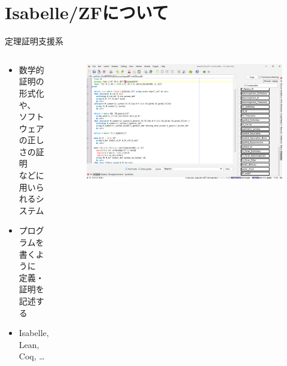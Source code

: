 \documentclass[17pt]{beamer}
\begin{document}
\section{Isabelle/ZFについて}

\begin{frame}{定理証明支援系}
    \begin{columns}
        \begin{column}{0.65\textwidth}
            {\small
            \begin{itemize}[itemsep=7pt]
                \item 数学的証明の形式化や、\\ソフトウェアの正しさの証明\\などに用いられるシステム
                \item プログラムを書くように\\定義・証明を記述する
                \item Isabelle, Lean, Coq, \ldots
            \end{itemize}
            }
        \end{column}
        \begin{column}{0.35\textwidth}
            \begin{figure}
                \includegraphics[width=1.0\linewidth]{./images/isabelle_editor.png}
            \end{figure}
            \vspace{-10pt}
            \begin{columns}
                \begin{column}{0.4\textwidth}

\end{column}
\end{columns}
\end{column}
\end{columns}
\end{frame}
\end{document}
